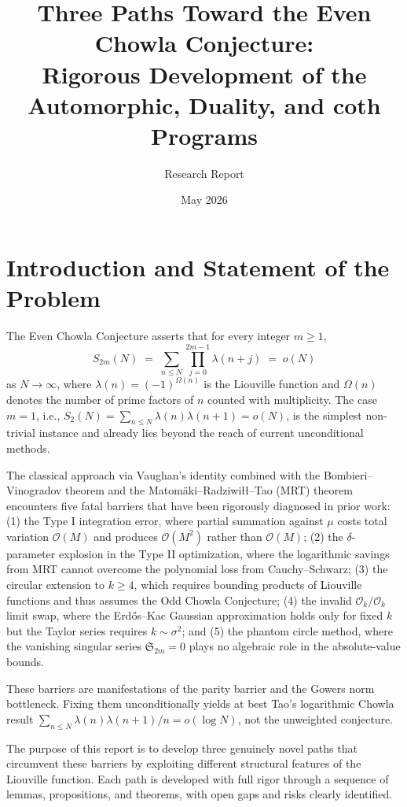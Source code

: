 \documentclass[11pt,a4paper]{article}
\title{Three Paths Toward the Even Chowla Conjecture:\\ Rigorous Development of the Automorphic, Duality, and coth Programs}
\author{Research Report}
\date{May 2026}
\theoremstyle{plain}
\theoremstyle{definition}
\begin{document}
\tableofcontents
\newpage

\section{Introduction and Statement of the Problem}

The Even Chowla Conjecture asserts that for every integer $m \geq 1$,
\begin{equation}\label{eq:even-chowla}
S_{2m}(N) \;=\; \sum_{n \leq N} \prod_{j=0}^{2m-1} \lambda(n+j) \;=\; o(N)
\end{equation}
as $N \to \infty$, where $\lambda(n) = (-1)^{\Omega(n)}$ is the Liouville function and $\Omega(n)$ denotes the number of prime factors of $n$ counted with multiplicity. The case $m = 1$, i.e., $S_2(N) = \sum_{n \leq N} \lambda(n)\lambda(n+1) = o(N)$, is the simplest non-trivial instance and already lies beyond the reach of current unconditional methods.

The classical approach via Vaughan's identity combined with the Bombieri--Vinogradov theorem and the Matom\"aki--Radziwi\l\l--Tao (MRT) theorem encounters five fatal barriers that have been rigorously diagnosed in prior work: (1) the Type I integration error, where partial summation against $\mu$ costs total variation $\mathcal{O}(M)$ and produces $\mathcal{O}(M^2)$ rather than $\mathcal{O}(M)$; (2) the $\delta$-parameter explosion in the Type II optimization, where the logarithmic savings from MRT cannot overcome the polynomial loss from Cauchy--Schwarz; (3) the circular extension to $k \geq 4$, which requires bounding products of Liouville functions and thus assumes the Odd Chowla Conjecture; (4) the invalid $\mathcal{O}_k/\mathcal{O}_k$ limit swap, where the Erd\H{o}s--Kac Gaussian approximation holds only for fixed $k$ but the Taylor series requires $k \sim \sigma^2$; and (5) the phantom circle method, where the vanishing singular series $\mathfrak{S}_{2m} = 0$ plays no algebraic role in the absolute-value bounds.

These barriers are manifestations of the parity barrier and the Gowers norm bottleneck. Fixing them unconditionally yields at best Tao's logarithmic Chowla result $\sum_{n \leq N} \lambda(n)\lambda(n+1)/n = o(\log N)$, not the unweighted conjecture.

The purpose of this report is to develop three genuinely novel paths that circumvent these barriers by exploiting different structural features of the Liouville function. Each path is developed with full rigor through a sequence of lemmas, propositions, and theorems, with open gaps and risks clearly identified.
\end{document}

